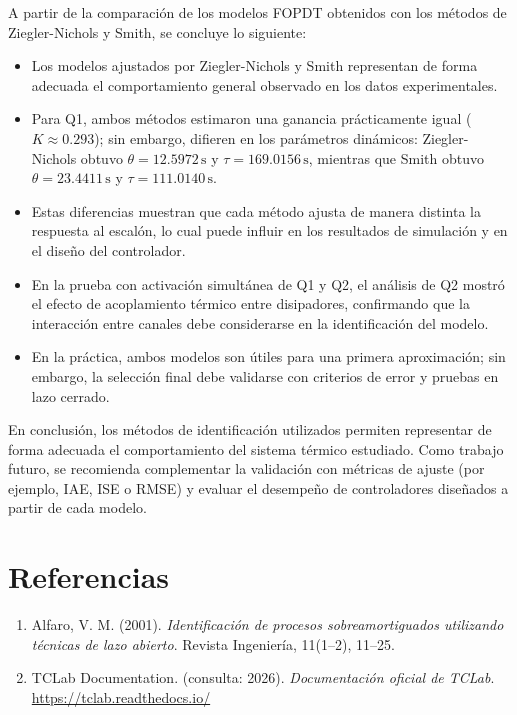 \documentclass[letterpaper,12pt]{article}
\begin{document}
A partir de la comparación de los modelos FOPDT obtenidos con los métodos de Ziegler-Nichols y Smith, se concluye lo siguiente:

\begin{itemize}
        \item Los modelos ajustados por Ziegler-Nichols y Smith representan de forma adecuada el comportamiento general observado en los datos experimentales.
            \item Para Q1, ambos métodos estimaron una ganancia prácticamente igual (\(K \approx 0.293\)); sin embargo, difieren en los parámetros dinámicos: Ziegler-Nichols obtuvo \(\theta = 12.5972\,\text{s}\) y \(\tau = 169.0156\,\text{s}\), mientras que Smith obtuvo \(\theta = 23.4411\,\text{s}\) y \(\tau = 111.0140\,\text{s}\).
                \item Estas diferencias muestran que cada método ajusta de manera distinta la respuesta al escalón, lo cual puede influir en los resultados de simulación y en el diseño del controlador.
                    \item En la prueba con activación simultánea de Q1 y Q2, el análisis de Q2 mostró el efecto de acoplamiento térmico entre disipadores, confirmando que la interacción entre canales debe considerarse en la identificación del modelo.
                        \item En la práctica, ambos modelos son útiles para una primera aproximación; sin embargo, la selección final debe validarse con criterios de error y pruebas en lazo cerrado.
\end{itemize}

En conclusión, los métodos de identificación utilizados permiten representar de forma adecuada el comportamiento del sistema térmico estudiado. Como trabajo futuro, se recomienda complementar la validación con métricas de ajuste (por ejemplo, IAE, ISE o RMSE) y evaluar el desempeño de controladores diseñados a partir de cada modelo.

\section*{Referencias}

\begin{enumerate}
        \item Alfaro, V. M. (2001). \textit{Identificación de procesos sobreamortiguados utilizando técnicas de lazo abierto}. Revista Ingeniería, 11(1--2), 11--25.
            
            \item TCLab Documentation. (consulta: 2026). \textit{Documentación oficial de TCLab}. \url{https://tclab.readthedocs.io/}
\end{enumerate}
\end{document}
